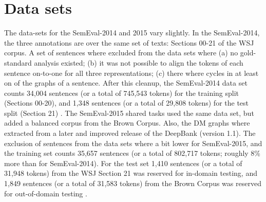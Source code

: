 \section{Data sets}
\label{sec:data-sets}

The data-sets for the SemEval-2014 and 2015 vary slightly. In the SemEval-2014, the three annotations are over the same set of texts: Sections 00-21 of the WSJ corpus. A set of sentences where excluded from the data sets where (a) no gold-standard analysis existed; (b) it was not possible to align the tokens of each sentence on-to-one for all three representations; (c) there where cycles in at least on of the graphs of a sentence. After this cleanup, the SemEval-2014 data set counts 34,004 sentences (or a total of 745,543 tokens) for the training split (Sections 00-20), and 1,348 sentences (or a total of 29,808 tokens) for the test split (Section 21) \cite{Oepen:14}. The SemEval-2015 shared tasks used the same data set, but added a balanced corpus from the Brown Corpus. Also, the DM graphs where extracted from a later and improved release of the DeepBank (version 1.1). The exclusion of sentences from the data sets where a bit lower for SemEval-2015, and the training set counts 35,657 sentences (or a total of 802,717 tokens; roughly 8\% more than for SemEval-2014). For the test set 1,410 sentences (or a total of 31,948 tokens) from the WSJ Section 21 was reserved for in-domain testing, and 1,849 sentences (or a total of 31,583 tokens) from the Brown Corpus was reserved for out-of-domain testing \cite{Oepen:15}.

